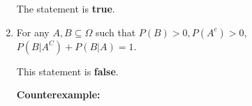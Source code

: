 \documentclass[letter]{article}
\theoremstyle{definition}
\newenvironment{soln}{
	\leavevmode\color{black}\ignorespaces
}{}
\begin{document}
\begin{enumerate}
            \begin{soln}
            The statement is \textbf{true}.

        
        
        
        
        
        
        
        
        
            
            \end{soln}

		
		\item For any $A, B\subseteq\Omega$ such that $P(B) > 0, P(A^c) > 0$,
		$P(B|A^C) + P(B|A) = 1$.\\ 
		
            
            \begin{soln}
            This statement is \textbf{false}.

            \textbf{Counterexample:}
            

\end{soln}
\end{enumerate}
\end{document}
